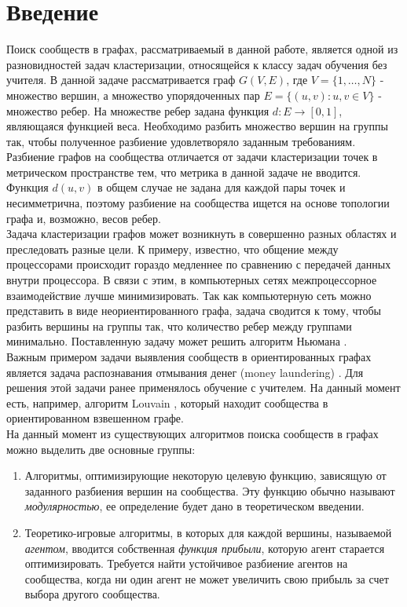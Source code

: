 \chapter{Введение}

Поиск сообществ в графах, рассматриваемый в данной работе, является одной из разновидностей задач кластеризации, относящейся к классу задач обучения без учителя. В данной задаче рассматривается граф $G(V, E)$, где $V=\{1,\dots,N\}$ - множество вершин, а множество упорядоченных пар $E=\{(u,v): u,v\in V\}$ - множество ребер. На множестве ребер задана функция $d:E\rightarrow [0,1]$, являющаяся функцией веса. Необходимо разбить множество вершин на группы так, чтобы полученное разбиение удовлетворяло заданным требованиям. Разбиение графов на сообщества отличается от задачи кластеризации точек в метрическом пространстве тем, что метрика в данной задаче не вводится. Функция $d(u,v)$ в общем случае не задана для каждой пары точек и несимметрична, поэтому разбиение на сообщества ищется на основе топологии графа и, возможно, весов ребер. \\

Задача кластеризации графов может возникнуть в совершенно разных областях и преследовать разные цели. К примеру, известно, что общение между процессорами происходит гораздо медленнее по сравнению с передачей данных внутри процессора. В связи с этим, в компьютерных сетях межпроцессорное взаимодействие лучше минимизировать. Так как компьютерную сеть можно представить в виде неориентированного графа, задача сводится к тому, чтобы разбить вершины на группы так, что количество ребер между группами минимально. Поставленную задачу может решить алгоритм Ньюмана \cite{Newman2004}.\\

Важным примером задачи выявления сообществ в ориентированных графах является задача распознавания отмывания денег (money laundering) \cite{ml}. Для решения этой задачи ранее применялось обучение с учителем. На данный момент есть, например, алгоритм Louvain \cite{ml1}, который находит сообщества в ориентированном взвешенном графе.\\

На данный момент из существующих алгоритмов поиска сообществ в графах можно выделить две основные группы: 
\begin{enumerate}
	\item Алгоритмы, оптимизирующие некоторую целевую функцию, зависящую от заданного разбиения вершин на сообщества. Эту функцию обычно называют \textit{модулярностью}, ее определение будет дано в теоретическом введении.
	
	\item Теоретико-игровые алгоритмы, в которых для каждой вершины, называемой \textit{агентом}, вводится собственная \textit{функция прибыли}, которую агент старается оптимизировать. Требуется найти устойчивое разбиение агентов на сообщества, когда ни один агент не может увеличить свою прибыль за счет выбора другого сообщества.
\end{enumerate} 

